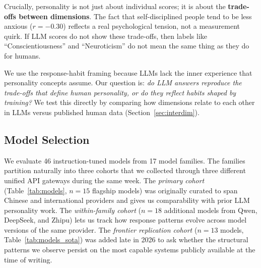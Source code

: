 \documentclass[11pt]{article}
\begin{document}
Crucially, personality is not just about individual scores; it is about the \textbf{trade-offs between dimensions}.
The fact that self-disciplined people tend to be less anxious ($r = -0.30$) \citep{soto2017bfi2} reflects a real psychological tension, not a measurement quirk.
If LLM scores do not show these trade-offs, then labels like ``Conscientiousness'' and ``Neuroticism'' do not mean the same thing as they do for humans.

We use the response-habit framing because LLMs lack the inner experience that personality concepts assume.
Our question is: \emph{do LLM answers reproduce the trade-offs that define human personality, or do they reflect habits shaped by training?}
We test this directly by comparing how dimensions relate to each other in LLMs versus published human data (Section~\ref{sec:interdim}).

\subsection{Model Selection}
\label{sec:models}

We evaluate 46 instruction-tuned models from 17 model families.
The families partition naturally into three cohorts that we collected through three different unified API gateways during the same week.
The \textit{primary cohort} (Table~\ref{tab:models}, $n = 15$ flagship models) was originally curated to span Chinese and international providers and gives us comparability with prior LLM personality work.
The \textit{within-family cohort} ($n = 18$ additional models from Qwen, DeepSeek, and Zhipu) lets us track how response patterns evolve across model versions of the same provider.
The \textit{frontier replication cohort} ($n = 13$ models, Table~\ref{tab:models_sota}) was added late in 2026 to ask whether the structural patterns we observe persist on the most capable systems publicly available at the time of writing.
\end{document}
